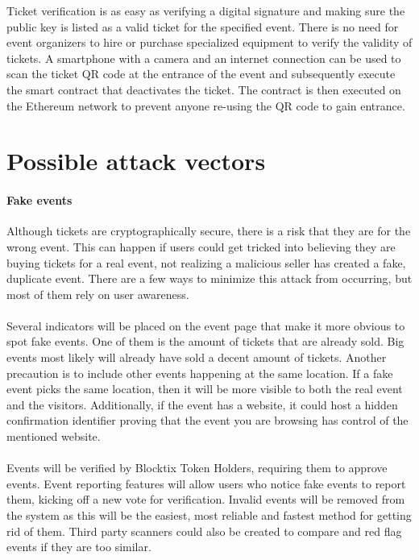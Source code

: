 \documentclass[a4paper]{article}
\begin{document}
Ticket verification is as easy as verifying a digital signature and making sure the public key is listed as a valid ticket for the specified event. There is no need for event organizers to hire or purchase specialized equipment to verify the validity of tickets. A smartphone with a camera and an internet connection can be used to scan the ticket QR code at the entrance of the event and subsequently execute the smart contract that deactivates the ticket. The contract is then executed on the Ethereum network to prevent anyone re-using the QR code to gain entrance.


\section{Possible attack vectors}
\paragraph{Fake events} Although tickets are cryptographically secure, there is a risk that they are for the wrong event. This can happen if users could get tricked into believing they are buying tickets for a real event, not realizing a malicious seller has created a fake, duplicate event. There are a few ways to minimize this attack from occurring, but most of them rely on user awareness.

\paragraph{} Several indicators will be placed on the event page that make it more obvious to spot fake events. One of them is the amount of tickets that are already sold. Big events most likely will already have sold a decent amount of tickets. Another precaution is to include other events happening at the same location. If a fake event picks the same location, then it will be more visible to both the real event and the visitors. Additionally, if the event has a website, it could host a hidden confirmation identifier proving that the event you are browsing has control of the mentioned website. 

\paragraph{} Events will be verified by Blocktix Token Holders, requiring them to approve events. Event reporting features will allow users who notice fake events to report them, kicking off a new vote for verification. Invalid events will be removed from the system as this will be the easiest, most reliable and fastest method for getting rid of them. Third party scanners could also be created to compare and red flag events if they are too similar. 



\end{document}
